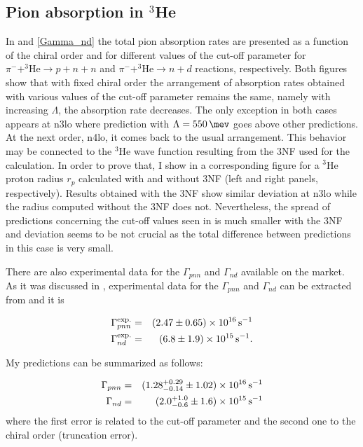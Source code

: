     \subsection{Pion absorption in $^3$He}
    
    In  and \ref{Gamma_nd} the total pion absorption rates are presented as a function
    of the chiral order and for different values of the cut-off parameter
    for $\pi^- + ^3\text{He} \rightarrow p + n + n$ 
    and $\pi^- + ^3\text{He} \rightarrow n + d$ reactions, respectively.
    Both figures show that with fixed chiral order the arrangement 
    of absorption rates obtained with various values of the cut-off parameter
    remains the same, namely with increasing $\Lambda$, the absorption rate decreases. The only exception in both cases 
    appears at \gls{n3lo} where prediction with $\Lambda = \SI{550}{\mev}$ goes above other predictions.
    At the next order, \gls{n4lo}, it comes back to the usual arrangement.
    This behavior may be connected to the $^3$He wave function resulting from the
    3NF used for the calculation.
    In order to prove that, I show in 
    a corresponding figure for a $^3$He proton radius $r_p$ calculated with 
    and without 3NF (left and right panels, respectively). Results obtained with the 3NF show
    similar deviation at \gls{n3lo} while the radius computed without the 3NF does not.
    Nevertheless, the spread of predictions concerning
    the cut-off values seen in  is much smaller
    with the 3NF and deviation seems to be not crucial as the total difference
    between predictions in this case is very small.

    There are also experimental data for the $\Gamma_{pnn}$ and $\Gamma_{nd}$ available on the market.
    As it was discussed in \cite{golak_pion}, experimental data for the $\Gamma_{pnn}$ and $\Gamma_{nd}$ 
    can be extracted from \cite{SCHWANNER1984,McCarthy1975,truol1974} and it is

    \begin{eqnarray}\label{Gam_He_exp}
        \Gamma_{pnn} ^{\rm exp.} & =& (2.47\pm 0.65)\times 10^{16} \, {\rm s^{-1}}\\
        \Gamma_{nd}^{\rm exp.} & =  & (6.8\pm 1.9)\times 10^{15} \, {\rm s^{-1}}.
    \end{eqnarray}

    My predictions can be summarized as follows:

    \begin{eqnarray}\label{Gam_nd_our}
        \Gamma_{pnn}  & =& (1.28^{+ 0.29}_{-0.14} \pm 1.02)\times 10^{16} \, {\rm s^{-1}}\\ \label{Gam_nd_pnn_our}
        \Gamma_{nd} & =  & (2.0^{+1.0}_{-0.6}\pm 1.6)\times 10^{15} \, {\rm s^{-1}}\\ \label{Gam_pnn_our}
    \end{eqnarray}
    where the first error is related to the cut-off parameter and the second one to the chiral order (truncation error).

